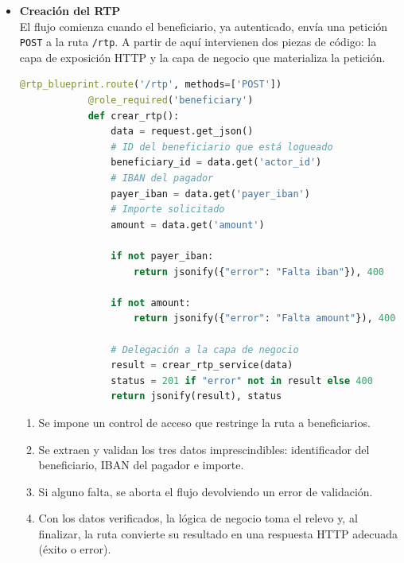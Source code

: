 \begin{itemize}
    \item \textbf{Creación del RTP}\\[6pt]
        El flujo comienza cuando el beneficiario, ya autenticado, envía una
        petición \texttt{POST} a la ruta \texttt{/rtp}.  
        A partir de aquí intervienen dos piezas de código: la capa de
        exposición HTTP y la capa de negocio que materializa la petición.
        \vspace{0.6em}

       \begin{lstlisting}[language=Python, style=custom]
            @rtp_blueprint.route('/rtp', methods=['POST'])
            @role_required('beneficiary')
            def crear_rtp():
                data = request.get_json()
                # ID del beneficiario que está logueado
                beneficiary_id = data.get('actor_id')
                # IBAN del pagador
                payer_iban = data.get('payer_iban')
                # Importe solicitado
                amount = data.get('amount')

                if not payer_iban:
                    return jsonify({"error": "Falta iban"}), 400

                if not amount:
                    return jsonify({"error": "Falta amount"}), 400

                # Delegación a la capa de negocio
                result = crear_rtp_service(data)
                status = 201 if "error" not in result else 400
                return jsonify(result), status
        \end{lstlisting}

        \begin{enumerate}
           \item Se impone un control de acceso que restringe la ruta a
                 beneficiarios.  
           \item Se extraen y validan los tres datos imprescindibles:
                 identificador del beneficiario, IBAN del pagador e importe.  
           \item Si alguno falta, se aborta el flujo devolviendo un error de
                 validación.  
           \item Con los datos verificados, la lógica de negocio toma el
                 relevo y, al finalizar, la ruta convierte su resultado en una
                 respuesta HTTP adecuada (éxito o error).
        \end{enumerate}
        \vspace{0.8em}


\end{itemize}
